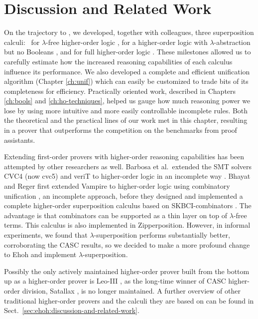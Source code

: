   \section{Discussion and Related Work} %
  \label{sec:ehoh2:discussion}
  
  On the trajectory to \ehohii{}, we developed, together with colleagues, three
  superposition calculi:\ \lfsup{} for $\lambda$-free higher-order logic
  \cite{bbcw-21-lfho}, \lsup{} for a higher-order logic with
  $\lambda$-abstra\-ction but no Booleans \cite{bbtvw-21-sup-lam}, and \osup{}
  for full higher-order logic \cite{bbtvw-21-sup-lam}. These milestones allowed
  us to carefully estimate how the increased reasoning capabilities of each
  calculus influence its performance. We also developed a complete and efficient
  unification algorithm (Chapter \ref{ch:unif}) which can easily be customized
  to trade bits of its completeness for efficiency. Practically oriented work,
  described in Chapters \ref{ch:bools} and \ref{ch:ho-techniques},
  helped us gauge how much reasoning power we lose by using more intuitive and
  more easily controllable incomplete rules. Both the theoretical and the
  practical lines of our work met in this chapter, resulting in a prover that
  outperforms the competition on the benchmarks from proof assistants.
  
  Extending first-order provers with higher-order reasoning capabilities has been
  attempted by other researchers as well.
  Barbosa et al.\ extended
  the SMT solvers CVC4 (now cvc5) and veriT to higher-order logic in an incomplete
  way \cite{brotb-19-ho-smt}.
  Bhayat and Reger first extended Vampire to
  higher-order logic using combinatory unification \cite{br-19-restricted-unif},
  an incomplete approach, before they designed and implemented a complete
  higher-order superposition calculus based on \textsf{SKBCI}-com\-binators \cite{br-20-full-sup-w-combs}.
  The advantage is that combinators can be supported as a thin layer on top of
  $\lambda$-free terms.
  This calculus is also implemented in Zipperposition.
  However, in informal experiments, we found that $\lambda$-superposition
  performs substantially better, corroborating the CASC results, so we decided to
  make a more profound change to Ehoh and implement $\lambda$-superposition.
  \pagebreak[2]

  Possibly the only actively maintained higher-order prover built from the bottom
  up as a higher-order prover is Leo-III \cite{sb-21-leo3}, as the long-time
  winner of CASC higher-order division, Satallax \cite{cb-12-satallax}, is no
  longer maintained. A further overview of other traditional higher-order provers and the calculi they are based on can be found in Sect.~\ref{sec:ehoh:discussion-and-related-work}.
  
